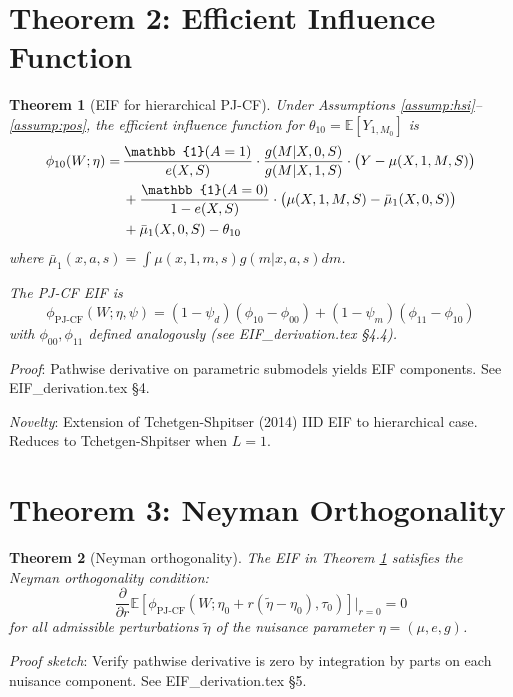 \documentclass[11pt]{article}
\theoremstyle{plain}
\newtheorem{theorem}{Theorem}
\theoremstyle{definition}
\newcommand{\E}{\mathbb{E}}
\newcommand{\ind}{\mathbb{1}}
\begin{document}
\section{Theorem 2: Efficient Influence Function}

\begin{theorem}[EIF for hierarchical PJ-CF]
\label{thm:eif}
Under Assumptions \ref{assump:hsi}--\ref{assump:pos}, the efficient influence function for $\theta_{10} = \E[Y_{1, M_0}]$ is
\begin{align}
    \phi_{10}(W; \eta) =\,& \frac{\ind(A=1)}{e(X, S)} \cdot \frac{g(M | X, 0, S)}{g(M | X, 1, S)} \cdot \big(Y - \mu(X, 1, M, S)\big) \notag \\
    &+ \frac{\ind(A=0)}{1 - e(X, S)} \cdot \big(\mu(X, 1, M, S) - \bar\mu_1(X, 0, S)\big) \notag \\
    &+ \bar\mu_1(X, 0, S) - \theta_{10} \label{eq:eif10}
\end{align}
where $\bar\mu_1(x, a, s) = \int \mu(x, 1, m, s) g(m | x, a, s) dm$.

The PJ-CF EIF is
\[
    \phi_{\mathrm{PJ\text{-}CF}}(W; \eta, \psi) = (1-\psi_d)(\phi_{10} - \phi_{00}) + (1-\psi_m)(\phi_{11} - \phi_{10})
\]
with $\phi_{00}, \phi_{11}$ defined analogously (see EIF\_derivation.tex §4.4).
\end{theorem}

\textit{Proof}: Pathwise derivative on parametric submodels yields EIF components. See EIF\_derivation.tex §4.

\textit{Novelty}: Extension of Tchetgen-Shpitser (2014) IID EIF to hierarchical case. Reduces to Tchetgen-Shpitser when $L=1$.

\section{Theorem 3: Neyman Orthogonality}

\begin{theorem}[Neyman orthogonality]
\label{thm:orth}
The EIF in Theorem \ref{thm:eif} satisfies the Neyman orthogonality condition:
\[
    \frac{\partial}{\partial r} \E[\phi_{\mathrm{PJ\text{-}CF}}(W; \eta_0 + r(\tilde\eta - \eta_0), \tau_0)] \bigg|_{r=0} = 0
\]
for all admissible perturbations $\tilde\eta$ of the nuisance parameter $\eta = (\mu, e, g)$.
\end{theorem}

\textit{Proof sketch}: Verify pathwise derivative is zero by integration by parts on each nuisance component. See EIF\_derivation.tex §5.
\end{document}
